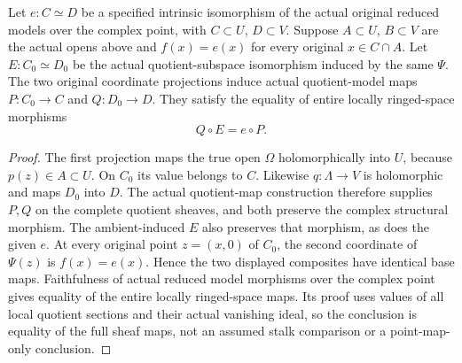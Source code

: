 \begin{lemma}
\label{hir:actual-stable-plane-specified-sheaf-square}
\leanok
Let $e:C\simeq D$ be a specified intrinsic isomorphism of the actual
original reduced models over the complex point, with $C\subset U$,
$D\subset V$. Suppose $A\subset U$, $B\subset V$ are the actual opens
above and $f(x)=e(x)$ for every original $x\in C\cap A$.
Let $E:C_0\simeq D_0$ be the actual quotient-subspace isomorphism
induced by the same $\Psi$. The two original coordinate projections
induce actual quotient-model maps $P:C_0\to C$ and $Q:D_0\to D$.
They satisfy the equality of entire locally ringed-space morphisms
\[
                  Q\circ E=e\circ P.
\]
\end{lemma}
\begin{proof}
The first projection maps the true open $\Omega$ holomorphically into
$U$, because $p(z)\in A\subset U$. On $C_0$ its value belongs to $C$.
Likewise $q:\Lambda\to V$ is holomorphic and maps $D_0$ into $D$.
The actual quotient-map construction therefore supplies $P,Q$ on
the complete quotient sheaves, and both preserve the complex
structural morphism. The ambient-induced $E$ also preserves that
morphism, as does the given $e$. At every original point $z=(x,0)$ of
$C_0$, the second coordinate of $\Psi(z)$ is $f(x)=e(x)$. Hence the
two displayed composites have identical base maps. Faithfulness of
actual reduced model morphisms over the complex point gives equality
of the entire locally ringed-space maps. Its proof uses values of
all local quotient sections and their actual vanishing ideal, so
the conclusion is equality of the full sheaf maps, not an assumed
stalk comparison or a point-map-only conclusion.
\end{proof}

